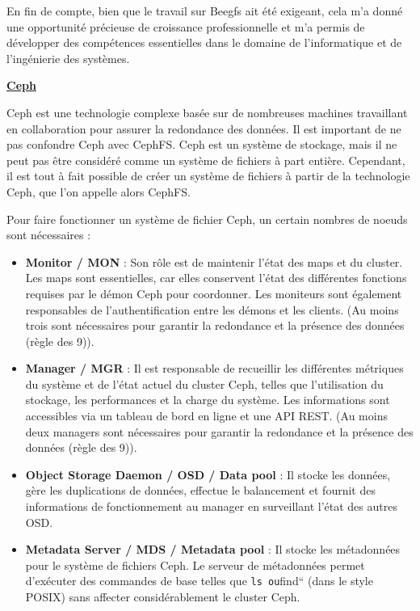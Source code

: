 \documentclass[a4paper,french,12pt, titlepage]{article}
\begin{document}
En fin de compte, bien que le travail sur Beegfs ait été exigeant, cela
m'a donné une opportunité précieuse de croissance professionnelle et m'a
permis de développer des compétences essentielles dans le domaine de
l'informatique et de l'ingénierie des systèmes.\newline

\textbf{\href{https://docs.ceph.com/en/quincy/}{Ceph} \cite{ceph2006}}

Ceph est une technologie complexe basée sur de nombreuses machines
travaillant en collaboration pour assurer la redondance des données. Il
est important de ne pas confondre Ceph avec CephFS. Ceph est un système
de stockage, mais il ne peut pas être considéré comme un système de
fichiers à part entière. Cependant, il est tout à fait possible de créer
un système de fichiers à partir de la technologie Ceph, que l'on appelle
alors CephFS.\newline

Pour faire fonctionner un système de fichier Ceph, un certain nombres de
noeuds sont nécessaires :\newline

\begin{itemize}
\item
  \textbf{Monitor / MON} : Son rôle est de maintenir l'état des maps et
  du cluster. Les maps sont essentielles, car elles conservent l'état
  des différentes fonctions requises par le démon Ceph pour coordonner.
  Les moniteurs sont également responsables de l'authentification entre
  les démons et les clients. (Au moins trois sont nécessaires pour
  garantir la redondance et la présence des données (règle des 9)).
\item
  \textbf{Manager / MGR} : Il est responsable de recueillir les
  différentes métriques du système et de l'état actuel du cluster Ceph,
  telles que l'utilisation du stockage, les performances et la charge du
  système. Les informations sont accessibles via un tableau de bord en
  ligne et une API REST. (Au moins deux managers sont nécessaires pour
  garantir la redondance et la présence des données (règle des 9)).
\item
  \textbf{Object Storage Daemon / OSD / Data pool} : Il stocke les
  données, gère les duplications de données, effectue le balancement et
  fournit des informations de fonctionnement au manager en surveillant
  l'état des autres OSD.
\item
  \textbf{Metadata Server / MDS / Metadata pool} : Il stocke les
  métadonnées pour le système de fichiers Ceph. Le serveur de
  métadonnées permet d'exécuter des commandes de base telles que
  \texttt{ls\textasciigrave{}\textasciigrave{}\ ou}find`` (dans le style
  POSIX) sans affecter considérablement le cluster Ceph.\newline
\end{itemize}
\end{document}
